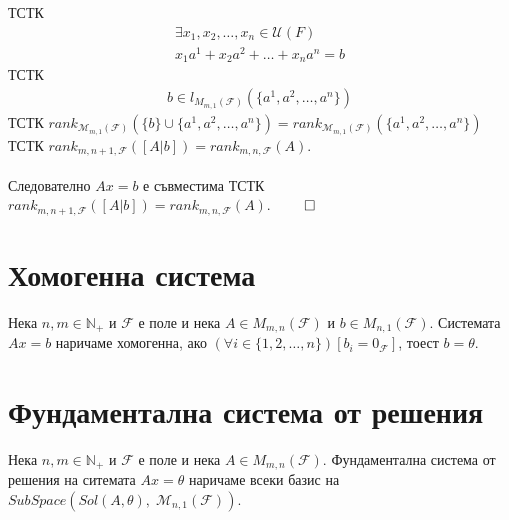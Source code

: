 \documentclass[a4paper,9pt]{extarticle}
\newcommand{\Nat}{\mathbb{N}}
\newcommand{\F}{\mathcal{F}}
\newcommand{\Uni}{\mathcal{U}}
\begin{document}
ТСТК
\begin{align*}
    \exists x_1, x_2, \dots, x_n \in \Uni(F) \\
    x_1 a^1 + x_2 a^2 + \dots + x_n a^n = b
\end{align*}
ТСТК
\begin{align*}
    b \in l_{M_{m, 1}(\F)}(\{a^1, a^2, \dots, a^n\})
\end{align*}
ТСТК \(rank_{\mathcal{M}_{m, 1}(\F)}(\{b\} \cup \{a^1, a^2, \dots, a^n\}) = rank_{\mathcal{M}_{m, 1}(\F)}(\{a^1, a^2, \dots, a^n\})\) \\
ТСТК \(rank_{m, n + 1, \F}([A | b]) = rank_{m, n, \F}(A)\). \\\\
Следователно \(Ax = b\) е съвместима ТСТК \(rank_{m, n + 1, \F}([A | b]) = rank_{m, n, \F}(A)\). \(\qed\)

\section{Хомогенна система}
Нека \(n, m \in \Nat_+\) и \(\F\) е поле и нека \(A \in M_{m, n}(\F)\) и \(b \in M_{n, 1}(\F)\).
Системата \(Ax = b\) наричаме хомогенна, ако \((\forall i \in \{1, 2, \dots, n\})[b_i = 0_\F]\), тоест \(b = \theta\).

\section{Фундаментална система от решения}
Нека \(n, m \in \Nat_+\) и \(\F\) е поле и нека \(A \in M_{m, n}(\F)\).
Фундаментална система от решения на ситемата \(Ax = \theta\) наричаме всеки базис на
\(SubSpace(Sol(A, \theta),\; \mathcal{M}_{n, 1}(\F))\).
\end{document}
